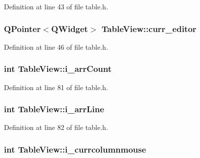 Definition at line 43 of file table.h.

\hypertarget{classTableView_a294454aaf1b1d44841f39bc28527d93c}{
\subsubsection[{curr\_\-editor}]{\setlength{\rightskip}{0pt plus 5cm}QPointer$<$QWidget$>$ {\bf TableView::curr\_\-editor}}}
\label{classTableView_a294454aaf1b1d44841f39bc28527d93c}


Definition at line 46 of file table.h.

\hypertarget{classTableView_a6624fcee6052dd850b9437ed02ed27d8}{
\subsubsection[{i\_\-arrCount}]{\setlength{\rightskip}{0pt plus 5cm}int {\bf TableView::i\_\-arrCount}}}
\label{classTableView_a6624fcee6052dd850b9437ed02ed27d8}


Definition at line 81 of file table.h.

\hypertarget{classTableView_a1f1333ce0ba4e23da60de63d9324d522}{
\subsubsection[{i\_\-arrLine}]{\setlength{\rightskip}{0pt plus 5cm}int {\bf TableView::i\_\-arrLine}}}
\label{classTableView_a1f1333ce0ba4e23da60de63d9324d522}


Definition at line 82 of file table.h.

\hypertarget{classTableView_a7b47dd87b8a2bcd86d413c2f19402429}{
\subsubsection[{i\_\-currcolumnmouse}]{\setlength{\rightskip}{0pt plus 5cm}int {\bf TableView::i\_\-currcolumnmouse}}}
\label{classTableView_a7b47dd87b8a2bcd86d413c2f19402429}


